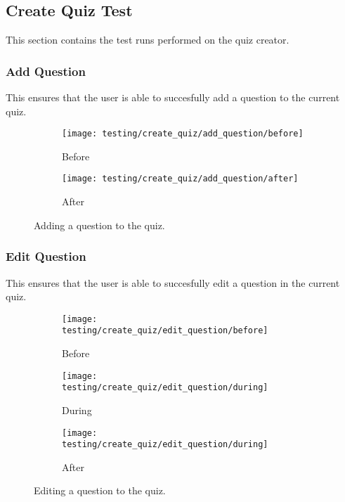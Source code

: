\subsection{Create Quiz Test} %
\label{sub:create_quiz_test}
This section contains the test runs performed on the quiz creator.

\clearpage

\subsubsection{Add Question} %
\label{ssub:add_question}
This ensures that the user is able to succesfully add a question to the current quiz.
\begin{figure}[!htbp]
\centering
\begin{subfigure}{0.5\textwidth}
  \centering
  \texttt{[image: testing/create\_quiz/add\_question/before]}
  \caption{Before}
  \label{fig:sub1}
\end{subfigure}%
\begin{subfigure}{0.5\textwidth}
  \centering
  \texttt{[image: testing/create\_quiz/add\_question/after]}
  \caption{After}
  \label{fig:sub2}
\end{subfigure}
\caption{Adding a question to the quiz.}
\label{fig:test}
\end{figure}


\subsubsection{Edit Question} %
\label{ssub:edit_question}
This ensures that the user is able to succesfully edit a question in the current quiz.
\begin{figure}[!htbp]
\centering
\begin{subfigure}{0.5\textwidth}
  \centering
  \texttt{[image: testing/create\_quiz/edit\_question/before]}
  \caption{Before}
  \label{fig:sub1}
\end{subfigure}%
\begin{subfigure}{0.5\textwidth}
  \centering
  \texttt{[image: testing/create\_quiz/edit\_question/during]}
  \caption{During}
  \label{fig:sub2}
\end{subfigure}
\begin{subfigure}{0.5\textwidth}
  \centering
  \texttt{[image: testing/create\_quiz/edit\_question/during]}
  \caption{After}
  \label{fig:sub3}
\end{subfigure}
\caption{Editing a question to the quiz.}
\label{fig:test}
\end{figure}


